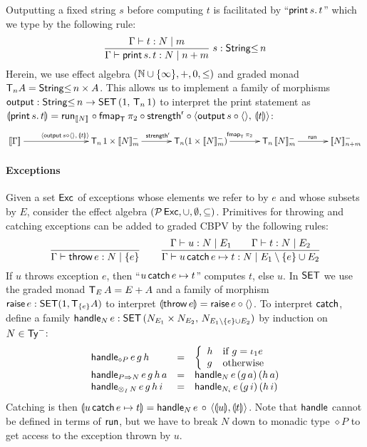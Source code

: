 \documentclass[acmsmall,review,anonymous]{acmart}\settopmatter{printfolios=true,printccs=false,printacmref=false}
\theoremstyle{remark}
\begin{document}
Outputting a fixed string $s$ before computing $t$ is
facilitated by ``$\print s t$'' which we type by the following rule:
\[
  \rux{\CompTy \Gamma t m N
     }{\CompTy \Gamma {\print s t} {n + m} N
     }{s : \StringLe n}
\]
Herein, we use effect algebra $(\bN \cup \{\infty\},+,0,\leq)$ and
graded monad $\T[n]A = \StringLe n \times A$.
%
This allows us to implement a family of morphisms
$\toutput : \StringLe n \to \Hom[\SET] {1} {\T[n]\,1}$ to interpret
the print statement as
$\dent {\print s t} = \run[\den N] \comp \fmap[\T]{\pi_2} \comp
\strengthr \comp \langle \toutput\,s \comp \langle\rangle,\, \dent t
\rangle$:
\[
\xymatrix@C=8ex{
  \den \Gamma
     \ar[rr]^{\langle \toutput\,s \comp \langle\rangle,\, \dent t \rangle}
&& \T[n]\,1 \times \Denn N m
     \ar[r]^{\strengthr}
& \T[n](1 \times \Denn N m)
     \ar[r]^{\fmap[\T]{\pi_2}}
& \T[n]\,\Denn N m
     \ar[r]^{\trun}
& \Denn N {n + m}
}
\]


\paragraph{Exceptions}

Given a set $\Exc$ of exceptions whose elements we refer to by $e$ and whose subsets by $E$,
consider the effect algebra $(\Pot\Exc,\cup,\emptyset,\subseteq)$.
Primitives for throwing and catching exceptions can be added to graded
CBPV by the following rules:
\newcommand{\eee}{E_1\setminus\{e\} \cup E_2}
\[
  \ru{}{\CompTy \Gamma {\throw e} {\{e\}} N} %
\qquad
  \ru{\CompTy \Gamma u {E_1} N \qquad
      \CompTy \Gamma t {E_2} N
    }{\CompTy \Gamma {\catch u e t} {\eee} N}
\]
If $u$ throws exception $e$, then ``$\catch u e t$'' computes $t$, else $u$.
%
In $\SET$ we use the graded monad $\T[E]\,A = E + A$ and a family of
morphism $\traise\,e : \SET(1,\T[\{e\}]A)$ to interpret
$\dent{\throw e} = \traise\,e \comp \langle\rangle$.  To interpret
$\tcatch$, define a family
$\thandle_N\,e : \Hom[\SET] {N_{E_1} \times N_{E_2}} {N_{\eee}}$ by
induction on $N \in \NTy$:
\[
\begin{array}{lcl}
  \handle[\diamond P] e g h & = & \left\{
                                  \begin{array}{ll}
                                    h & \mbox{if } g = \iota_1 e \\
                                    g & \mbox{otherwise}
                                  \end{array}
\right. \\
  \handle[P \To N] e g h \, a & = & \handle[N] e {(g\,a)} {(h\,a)} \\
  \handle[\tupt I N] e g h \, i & = & \handle[N_i] e {(g\,i)} {(h\,i)} \\
\end{array}
\]
Catching is then
$\dent {\catch u e t} = \handle[N] e \comp \langle \dent u, \dent t
\rangle$.
Note that $\thandle$ cannot be defined in terms of $\trun$, but we
have to break $N$ down to monadic type $\diamond P$
to get access to the exception
thrown by $u$.
\end{document}
